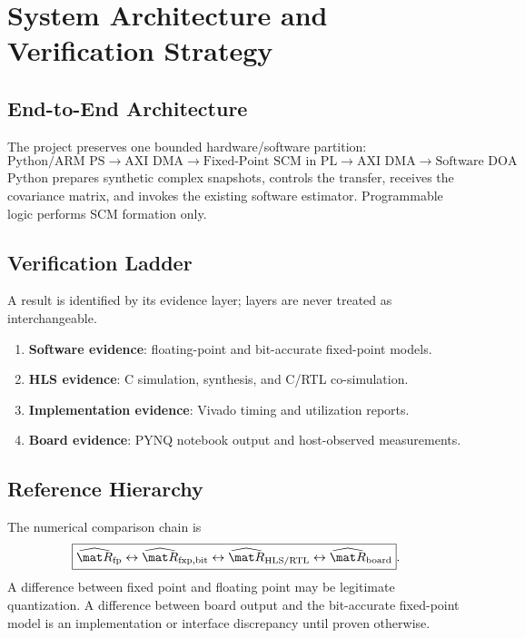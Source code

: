 ﻿\chapter{System Architecture and Verification Strategy}
\label{ch:system-architecture}

\section{End-to-End Architecture}
The project preserves one bounded hardware/software partition:
\begin{equation}
\boxed{
\text{Python/ARM PS}
\rightarrow
\text{AXI DMA}
\rightarrow
\text{Fixed-Point SCM in PL}
\rightarrow
\text{AXI DMA}
\rightarrow
\text{Software DOA}
}.
\end{equation}
Python prepares synthetic complex snapshots, controls the transfer, receives the covariance
matrix, and invokes the existing software estimator. Programmable logic performs SCM
formation only.

\section{Verification Ladder}
A result is identified by its evidence layer; layers are never treated as interchangeable.
\begin{enumerate}
    \item \textbf{Software evidence}: floating-point and bit-accurate fixed-point models.
    \item \textbf{HLS evidence}: C simulation, synthesis, and C/RTL co-simulation.
    \item \textbf{Implementation evidence}: Vivado timing and utilization reports.
    \item \textbf{Board evidence}: PYNQ notebook output and host-observed measurements.
\end{enumerate}

\section{Reference Hierarchy}
The numerical comparison chain is
\begin{equation}
\boxed{
\widehat{\mat R}_{\mathrm{fp}}
\leftrightarrow
\widehat{\mat R}_{\mathrm{fxp,bit}}
\leftrightarrow
\widehat{\mat R}_{\mathrm{HLS/RTL}}
\leftrightarrow
\widehat{\mat R}_{\mathrm{board}}
}.
\end{equation}
A difference between fixed point and floating point may be legitimate quantization. A
difference between board output and the bit-accurate fixed-point model is an implementation
or interface discrepancy until proven otherwise.

